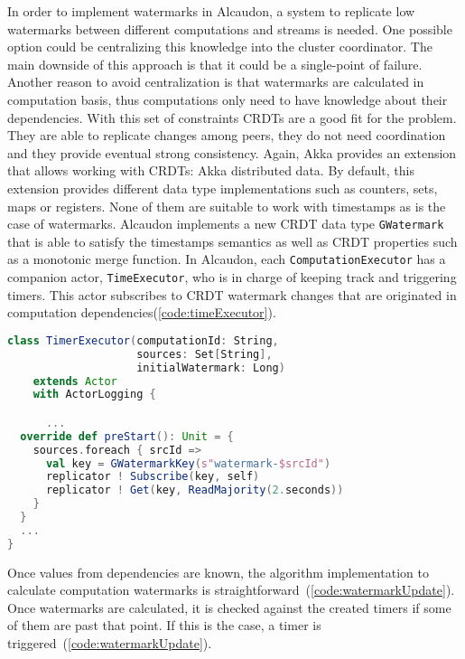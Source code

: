 In order to implement watermarks in Alcaudon, a system to replicate low
watermarks between different computations and streams is needed. One possible
option could be centralizing this knowledge into the cluster coordinator. The main
downside of this approach is that it could be a single-point of failure. Another
reason to avoid centralization is that watermarks are calculated in computation
basis, thus computations only need to have knowledge about their dependencies.
With this set of constraints \acs{CRDT}s are a good fit for the problem. They
are able to replicate changes among peers, they do not need coordination and
they provide eventual strong consistency. Again, Akka provides an extension that
allows working with \acs{CRDT}s: Akka distributed data. By default, this
extension provides different data type implementations such as counters, sets,
maps or registers. None of them are suitable to work with timestamps as is the
case of watermarks. Alcaudon implements a new \acs{CRDT} data type
\lstinline{GWatermark} that is able to satisfy the timestamps semantics as well
as \acs{CRDT} properties such as a monotonic merge function.
In Alcaudon, each \lstinline[columns=fixed]{ComputationExecutor} has a companion
actor, \lstinline[columns=fixed]{TimeExecutor}, who is in charge of keeping track
and triggering timers. This actor subscribes to \acs{CRDT} watermark changes that are
originated in computation dependencies(\ref{code:timeExecutor}).

\begin{lstlisting}[language=scala, frame=trBL, label=code:timeExecutor, float=ht, caption = {TimerExecutor \acs{CRDT}s dependencies subscription}]
class TimerExecutor(computationId: String,
                    sources: Set[String],
                    initialWatermark: Long)
    extends Actor
    with ActorLogging {

      ...
  override def preStart(): Unit = {
    sources.foreach { srcId =>
      val key = GWatermarkKey(s"watermark-$srcId")
      replicator ! Subscribe(key, self)
      replicator ! Get(key, ReadMajority(2.seconds))
    }
  }
  ...
}
\end{lstlisting}

Once values from dependencies are known, the algorithm implementation to
calculate computation watermarks is straightforward~(\ref{code:watermarkUpdate}).
Once watermarks are calculated, it is checked against the created timers if some
of them are past that point. If this is the case, a timer is
triggered~(\ref{code:watermarkUpdate}).

